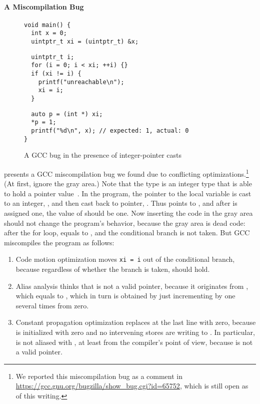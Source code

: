 \paragraph{A Miscompilation Bug}

\begin{figure}[t]
\begin{center}
\small
\begin{minipage}{0.5\textwidth}
\begin{verbatim}
void main() { 
  int x = 0;
  uintptr_t xi = (uintptr_t) &x;
\end{verbatim}
\vskip -0.7cm
\begin{verbatim}
  uintptr_t i;
  for (i = 0; i < xi; ++i) {}
  if (xi != i) {
    printf("unreachable\n");
    xi = i;
  }
\end{verbatim}
\vskip -0.7cm
\begin{verbatim}
  auto p = (int *) xi;
  *p = 1;
  printf("%d\n", x); // expected: 1, actual: 0
}
\end{verbatim}
\end{minipage}
\end{center}
\caption{A GCC bug in the presence of integer-pointer casts}
\label{fig:introduction:bug}
\end{figure}

 presents a GCC miscompilation bug we found due to conflicting
optimizations.\footnote{We reported this miscompilation bug as a comment in
  \url{https://gcc.gnu.org/bugzilla/show_bug.cgi?id=65752}, which is still open as of this writing.}
(At first, ignore the gray area.)  Note that the type  is an integer type that is
able to hold a pointer value~\cite[\S7.20.1.4]{c18}.  In the program, the pointer to the local
variable  is cast to an integer, , and then cast back to pointer, .  Thus
 points to , and after  is assigned one, the value of  should be
one.  Now inserting the code in the gray area should not change the program's behavior, because the
gray area is dead code: after the for loop,  equals to , and the conditional branch
is not taken.  But GCC miscompiles the program as follows:
%
\begin{enumerate}
\item Code motion optimization moves \texttt{xi = i} out of the conditional branch, because
  regardless of whether the branch is taken,  should hold.
\item Alias analysis thinks that  is not a valid pointer, because it originates from
  , which equals to , which in turn is obtained by just incrementing by one several
  times from zero.
\item Constant propagation optimization replaces  at the last line with zero, because
   is initialized with zero and no intervening stores are writing to .  In
  particular,  is not aliased with , at least from the compiler's point of view,
  because  is not a valid pointer.
\end{enumerate}

